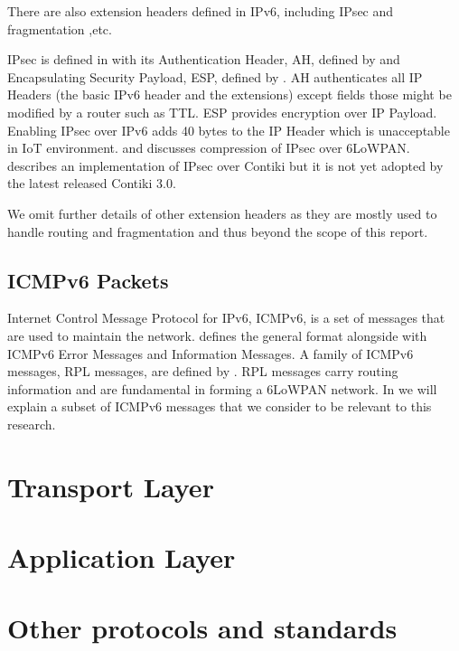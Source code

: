 There are also extension headers defined in IPv6\cite{rfc2460}, including IPsec and fragmentation ,etc.

IPsec is defined in \cite{rfc4301} with its Authentication Header, AH, defined by \cite{rfc4302} and Encapsulating Security Payload, ESP, defined by \cite{rfc4303}. AH authenticates all IP Headers (the basic IPv6 header and the extensions) except fields  those might be modified by a router such as TTL. ESP provides encryption over IP Payload. Enabling IPsec over IPv6 adds 40 bytes to the IP Header which is unacceptable in IoT environment. \cite{6LoWPANIPsec} and \cite{CompressIPsec} discusses compression of IPsec over 6LoWPAN. \cite{ContikiIPsec} describes an implementation of IPsec over Contiki but it is not yet adopted by the latest released Contiki 3.0.

We omit further details of other extension headers as they are mostly used to handle routing and fragmentation and thus beyond the scope of this report.

\subsection{ICMPv6 Packets} \label{Subsec: ICMPv6}
Internet Control Message Protocol for IPv6, ICMPv6, is a set of messages that are used to maintain the network. \cite{rfc4443} defines the general format alongside with ICMPv6 Error Messages and Information Messages. A family of ICMPv6 messages, RPL messages, are defined by \cite{rfc6550}. RPL messages carry routing information and are fundamental in forming a 6LoWPAN network. In  we will explain a subset of ICMPv6 messages that we consider to be relevant to this research.


\section{Transport Layer} \label{Sec: Transportation Layer}

\section{Application Layer}

\section{Other protocols and standards}
